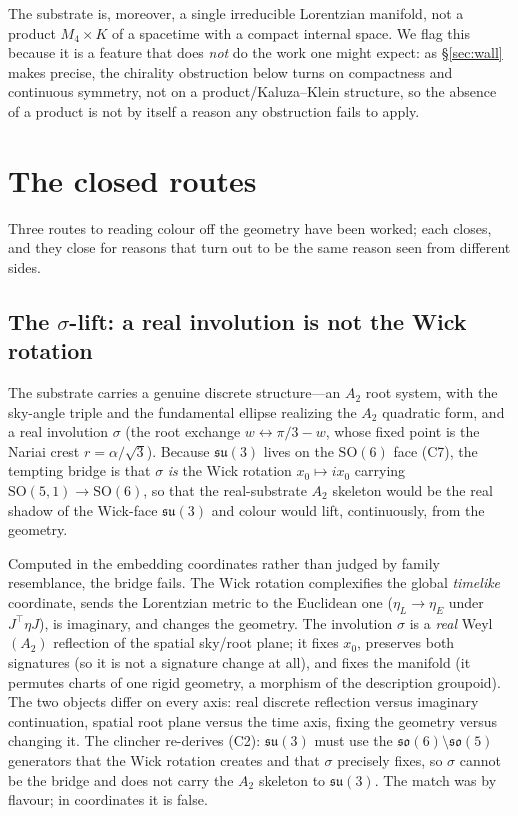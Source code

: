 \documentclass[11pt]{article}
\theoremstyle{plain}
\theoremstyle{remark}
\newcommand{\so}{\mathfrak{so}}
\newcommand{\su}{\mathfrak{su}}
\newcommand{\SO}{\mathrm{SO}}
\begin{document}
The substrate is, moreover, a single irreducible Lorentzian manifold, not a product $M_4\times K$ of a spacetime with a compact internal space. We flag this because it is a feature that does \emph{not} do the work one might expect: as \S\ref{sec:wall} makes precise, the chirality obstruction below turns on compactness and continuous symmetry, not on a product/Kaluza--Klein structure, so the absence of a product is not by itself a reason any obstruction fails to apply.

\section{The closed routes}\label{sec:routes}

Three routes to reading colour off the geometry have been worked; each closes, and they close for reasons that turn out to be the same reason seen from different sides.

\subsection{The $\sigma$-lift: a real involution is not the Wick rotation}\label{sec:sigma}

The substrate carries a genuine discrete structure---an $A_2$ root system, with the sky-angle triple and the fundamental ellipse realizing the $A_2$ quadratic form, and a real involution $\sigma$ (the root exchange $w\leftrightarrow \pi/3-w$, whose fixed point is the Nariai crest $r=\alpha/\sqrt3$). Because $\su(3)$ lives on the $\SO(6)$ face (C7), the tempting bridge is that $\sigma$ \emph{is} the Wick rotation $x_0\mapsto ix_0$ carrying $\SO(5,1)\to\SO(6)$, so that the real-substrate $A_2$ skeleton would be the real shadow of the Wick-face $\su(3)$ and colour would lift, continuously, from the geometry.

Computed in the embedding coordinates rather than judged by family resemblance, the bridge fails. The Wick rotation complexifies the global \emph{timelike} coordinate, sends the Lorentzian metric to the Euclidean one ($\eta_L\to\eta_E$ under $J^\top\eta J$), is imaginary, and changes the geometry. The involution $\sigma$ is a \emph{real} Weyl$(A_2)$ reflection of the spatial sky/root plane; it fixes $x_0$, preserves both signatures (so it is not a signature change at all), and fixes the manifold (it permutes charts of one rigid geometry, a morphism of the description groupoid). The two objects differ on every axis: real discrete reflection versus imaginary continuation, spatial root plane versus the time axis, fixing the geometry versus changing it. The clincher re-derives (C2): $\su(3)$ must use the $\so(6)\setminus\so(5)$ generators that the Wick rotation creates and that $\sigma$ precisely fixes, so $\sigma$ cannot be the bridge and does not carry the $A_2$ skeleton to $\su(3)$. The match was by flavour; in coordinates it is false.
\end{document}
